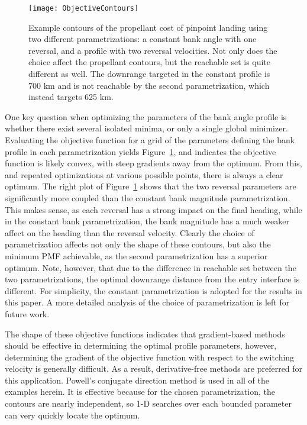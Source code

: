 \documentclass[letterpaper, paper,11pt]{AAS}
\begin{document}
\begin{figure}[h!]
		\centering
		\texttt{[image: ObjectiveContours]} 
		\caption{Example contours of the propellant cost of pinpoint landing using two different parametrizations: a constant bank angle with one reversal, and a profile with two reversal velocities. Not only does the choice affect the propellant contours, but the reachable set is quite different as well. The downrange targeted in the constant profile is 700 km and is not reachable by the second parametrization, which instead targets 625 km. }
		\label{fig_objective_contour}
\end{figure}
One key question when optimizing the parameters of the bank angle profile is whether there exist several isolated minima, or only a single global minimizer. 
Evaluating the objective function for a grid of the parameters defining the bank profile in each parametrization yields Figure~\ref{fig_objective_contour}, and indicates the objective function is likely convex, with steep gradients away from the optimum. From this, and repeated optimizations at various possible points, there is always a clear optimum.  The right plot of Figure~\ref{fig_objective_contour} shows that the two reversal parameters are significantly more coupled than the constant bank magnitude parametrization. This makes sense, as each reversal has a strong impact on the final heading, while in the constant bank parametrization, the bank magnitude has a much weaker affect on the heading than the reversal velocity. Clearly the choice of parametrization affects not only the shape of these contours, but also the minimum PMF achievable, as the second parametrization has a superior optimum. Note, however, that due to the difference in reachable set between the two parametrizations, the optimal downrange distance from the entry interface is different. For simplicity, the constant parametrization is adopted for the results in this paper. A more detailed analysis of the choice of parametrization is left for future work.

The shape of these objective functions indicates that gradient-based methods should be effective in determining the optimal profile parameters, however, determining the gradient of the objective function with respect to the switching velocity is generally difficult. As a result, derivative-free methods are preferred for this application. Powell's conjugate direction method \cite{PowellsMethod} is used in all of the examples herein. It is effective because for the chosen parametrization, the contours are nearly independent, so 1-D searches over each bounded parameter can very quickly locate the optimum. 
\end{document}
